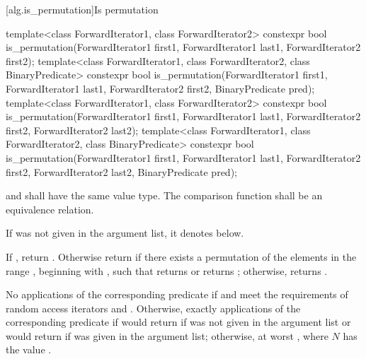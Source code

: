 [alg.is_permutation]{Is permutation}

%
\begin{itemdecl}
template<class ForwardIterator1, class ForwardIterator2>
  constexpr bool is_permutation(ForwardIterator1 first1, ForwardIterator1 last1,
                                ForwardIterator2 first2);
template<class ForwardIterator1, class ForwardIterator2,
         class BinaryPredicate>
  constexpr bool is_permutation(ForwardIterator1 first1, ForwardIterator1 last1,
                                ForwardIterator2 first2, BinaryPredicate pred);
template<class ForwardIterator1, class ForwardIterator2>
  constexpr bool is_permutation(ForwardIterator1 first1, ForwardIterator1 last1,
                                ForwardIterator2 first2, ForwardIterator2 last2);
template<class ForwardIterator1, class ForwardIterator2,
         class BinaryPredicate>
  constexpr bool is_permutation(ForwardIterator1 first1, ForwardIterator1 last1,
                                ForwardIterator2 first2, ForwardIterator2 last2,
                                BinaryPredicate pred);
\end{itemdecl}

\begin{itemdescr}
\pnum
\requires
{} and  shall have
the same value type.
The comparison function shall be an equivalence relation.

\pnum
\remarks
If  was not given in the argument list,
it denotes  below.

\pnum
\returns
If , return .
Otherwise return 
if there exists a permutation of the elements
in the range ,
beginning with ,
such that  returns  or
 returns ;
otherwise, returns .

\pnum
\complexity
No applications of the corresponding predicate
if  and 
meet the requirements of random access iterators and
.
Otherwise, exactly  applications
of the corresponding predicate
if  would return 
if  was not given in the argument list or
 would return 
if  was given in the argument list;
otherwise, at worst , where $N$ has the value .
\end{itemdescr}

